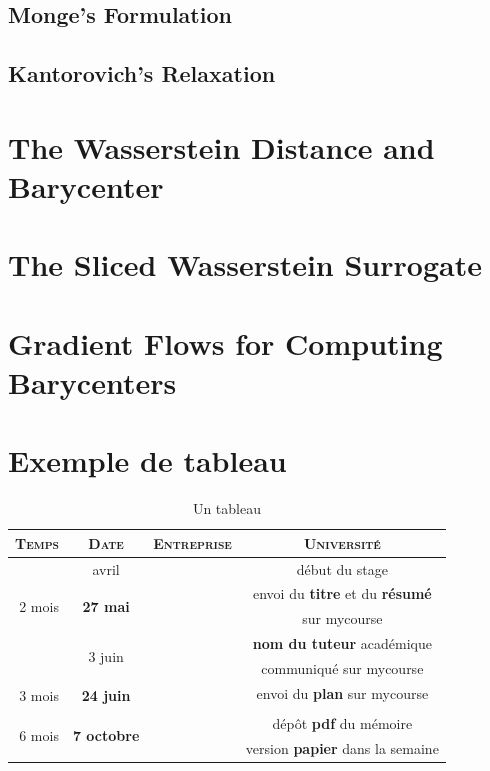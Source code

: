 \documentclass[
  a4paper,
  11pt,
  a4paper,
  twoside,
  openright]{report}
\providecommand{\red}[1]{\textbf{{\color{red}#1}}}
\providecommand{\sigle}{\textsc}
\begin{document}
\subsection{Monge's Formulation}\label{monges-formulation}

\subsection{Kantorovich's Relaxation}\label{kantorovichs-relaxation}

\section{The Wasserstein Distance and
Barycenter}\label{the-wasserstein-distance-and-barycenter}

\section{The Sliced Wasserstein
Surrogate}\label{the-sliced-wasserstein-surrogate}

\section{Gradient Flows for Computing
Barycenters}\label{gradient-flows-for-computing-barycenters}

\section{Exemple de tableau}\label{exemple-de-tableau}

\begin{table}[htb!]
\small
\caption{Un tableau}
\begin{tabular}{r|c|c|c}
\sigle{Temps} & \sigle{Date} & \sigle{Entreprise} & \sigle{Université} \\
\hline
& avril & & début du stage \\
\hline
\multirow{2}{*}{2 mois} & \multirow{2}{*}{\textbf{27 mai}} & & envoi du \red{titre} et du \red{résumé} \\
& & & sur mycourse \\
\hline
& \multirow{2}{*}{3 juin} & & \red{nom du tuteur} académique \\
& & & communiqué sur mycourse \\
\hline
\multirow{2}{*}{3 mois} & \multirow{2}{*}{\textbf{24 juin}} & & envoi du \red{plan} sur mycourse \\
& & & \\
\hline
\multirow{2}{*}{6 mois} & \multirow{2}{*}{\textbf{7 octobre}} & & dépôt \red{pdf} du mémoire \\
& & & version \red{papier} dans la semaine \\
\hline
\end{tabular}
\end{table}
\end{document}
